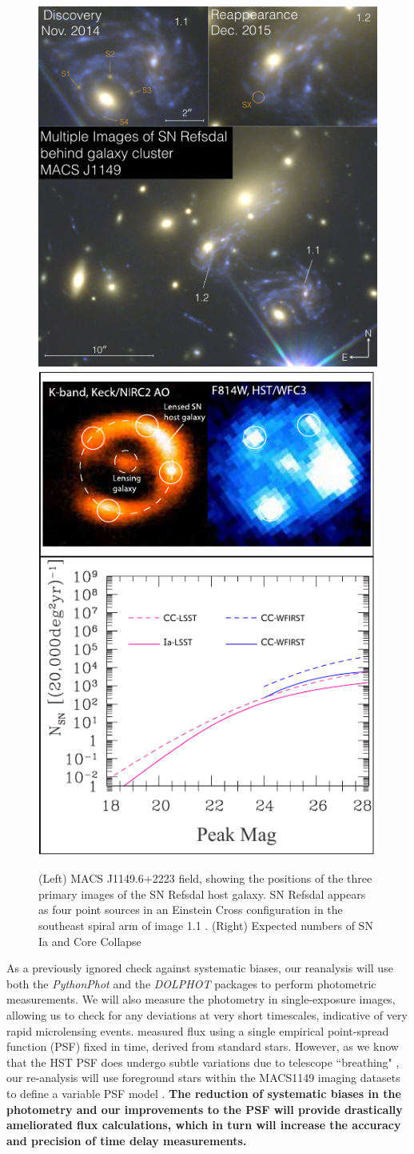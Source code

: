 \begin{figure}[h]
\centering
\includegraphics[width=.5\linewidth]{FIG/refsdal_summary}
\includegraphics[width=.37\linewidth]{FIG/lensed3}
\caption{
(Left) MACS J1149.6+2223 field, showing the positions of the three primary
images of the SN Refsdal host galaxy. SN
Refsdal appears as four point sources in an Einstein Cross
configuration in the southeast spiral arm of image 1.1 \citep{Rodney:2016}. (Right)
Expected numbers of SN Ia and Core Collapse}
\end{figure}%

As a previously ignored check against systematic biases, our reanalysis will use both the \textit{PythonPhot} and the \textit{DOLPHOT} packages to 
perform photometric measurements. We will also measure the photometry in single-exposure images, allowing us to check for any deviations 
at very short timescales, indicative of very rapid microlensing events. \cite{Rodney:2016} measured flux using a single empirical 
point-spread function (PSF) fixed in time, derived from standard stars. However, as we know that the HST PSF does undergo 
subtle variations due to telescope ``breathing" \citep{Dressel:2012}, our re-analysis will use foreground stars within the MACS1149 imaging 
datasets to define a variable PSF model \citep{Cox:2011}. \textbf{The reduction of systematic biases in the photometry and our improvements to the 
PSF will provide drastically ameliorated flux calculations, which in turn will increase the accuracy and precision of time delay measurements.}

